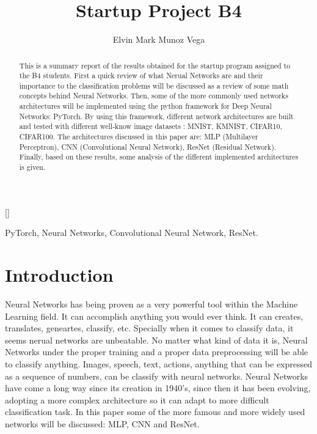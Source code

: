 \documentclass[english,preprint,JIP]{ipsj}
\begin{document}
\title{Startup Project B4}

\author{Elvin Mark Munoz Vega}{}[]

\begin{abstract}
    This is a summary report of the results obtained for the startup program
    assigned to the B4 students. First a quick review of what Nerual Networks
    are and their importance to the classification problems will be discussed as
    a review of some math concepts behind Neural Networks. Then, some of the
    more commonly used networks architectures will be implemented using the
    python framework for Deep Neural Networks: PyTorch. By using this framework,
    different network architectures are built and tested with different
    well-know image datasets : MNIST, KMNIST, CIFAR10, CIFAR100. The
    architectures discussed in this paper are: MLP (Multilayer Perceptron), CNN
    (Convolutional Neural Network), ResNet (Residual Network). Finally, based on
    these results, some analysis of the different implemented architectures is
    given.
\end{abstract}

\begin{keyword}
    PyTorch, Neural Networks, Convolutional Neural Network, ResNet.
\end{keyword}

\maketitle

\section{Introduction}

Neural Networks has being proven as a very powerful tool within the Machine
Learning field. It can accomplish anything you would ever think. It can creates,
translates, geneartes, classify, etc. Specially when it comes to classify data,
it seems nerual networks are unbeatable. No matter what kind of data it is,
Neural Networks under the proper training and a proper data preprocessing will
be able to classify anything. Images, speech, text, actions, anything that can
be expressed as a sequence of numbers, can be classify with neural networks.
Neural Networks have come a long way since its creation in 1940's, since then it
has been evolving, adopting a more complex architecture so it can adapt to more
difficult classification task. In this paper some of the more famous and more
widely used networks will be discussed: MLP, CNN and ResNet.\\
\end{document}

